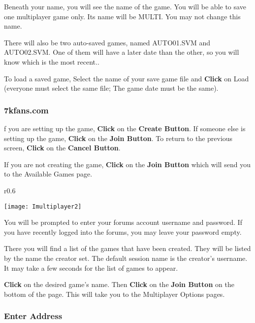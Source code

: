 Beneath your name, you will see the name of the game. You will be able to save one multiplayer game only. Its name will be MULTI. You may not change this name.

There will also be two auto-saved games, named AUTO01.SVM and AUTO02.SVM. One of them will have a later date than the other, so you will know which is the most recent..

To load a saved game, Select the name of your save game file and \textbf{Click} on Load (everyone must select the same file; The game date must be the same).

\subsubsection{\textsf{7kfans.com}} %


f you are setting up the game, \textbf{Click} on the \textbf{Create Button}. If someone else is setting up the game, \textbf{Click} on the \textbf{Join Button}. To return to the previous screen, \textbf{Click} on the \textbf{Cancel Button}.

If you are not creating the game, \textbf{Click} on the \textbf{Join Button} which will send you to the Available Games page.

\begin{wrapfigure}{r}{0.6\textwidth}
	\begin{center}
		\vspace{-20pt}
		\texttt{[image: Imultiplayer2]} %
	\end{center}
	\vspace{-20pt}
\end{wrapfigure}

You will be prompted to enter your forums account username and password. If you have recently logged into the forums, you may leave your password empty.

There you will find a list of the games that have been created. They will be listed by the name the creator set. The default session name is the creator’s username. It may take a few seconds for the list of games to appear.

\textbf{Click} on the desired game’s name. Then \textbf{Click} on the \textbf{Join Button} on the bottom of the page. This will take you to the Multiplayer Options pages.

\subsubsection{\textsf{Enter Address}}

